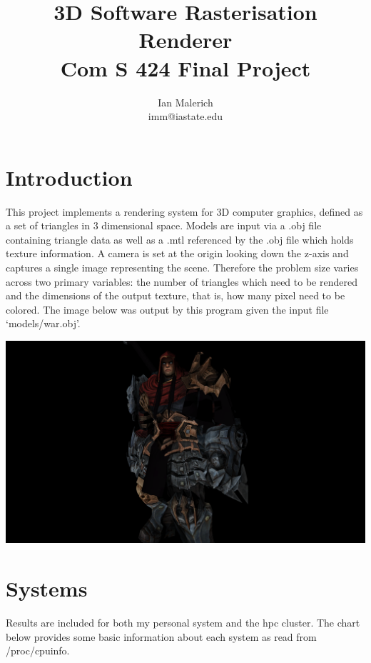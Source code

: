 \documentclass[12pt]{article}
\title{\vspace{-6ex}3D Software Rasterisation Renderer \\ \large Com S 424 Final Project}
\author{Ian Malerich \\ imm@iastate.edu}
\begin{document}
\raggedright

\maketitle

\section*{Introduction}

This project implements a rendering system for 3D computer graphics, defined as a set
of triangles in 3 dimensional space. Models are input via a .obj file containing triangle data
as well as a .mtl referenced by the .obj file which holds texture information. A camera is set
at the origin looking down the z-axis and captures a single image representing the scene.
Therefore the problem size varies across two primary variables: the number of triangles which
need to be rendered and the dimensions of the output texture, that is, how many pixel need
to be colored.  The image below was output by this program given the input file `models/war.obj'.

\begin{center}
	\includegraphics[scale=0.17]{war.png}
\end{center}

\clearpage
\section*{Systems}

Results are included for both my personal system and the hpc cluster. 
The chart below provides some basic information about each system as read from /proc/cpuinfo.
\end{document}
